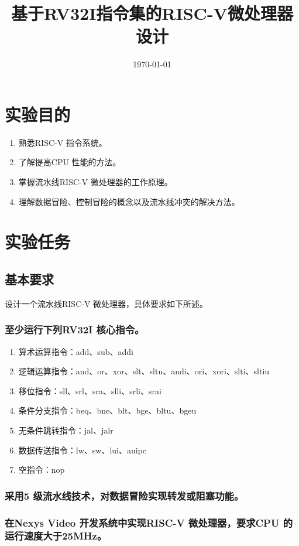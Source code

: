 \documentclass{../source/zjureport}
\title{基于RV32I指令集的RISC-V微处理器设计}
\date{\today}
\begin{document}
    \makecover
    \makeheader

    \section{实验目的}
        \begin{enumerate}
            \item 熟悉RISC-V 指令系统。
            \item 了解提高CPU 性能的方法。
            \item 掌握流水线RISC-V 微处理器的工作原理。
            \item 理解数据冒险、控制冒险的概念以及流水线冲突的解决方法。
        \end{enumerate}
    
    \section{实验任务}
        \subsection{基本要求}
        设计一个流水线RISC-V 微处理器，具体要求如下所述。
            \subsubsection{至少运行下列RV32I 核心指令。}
                \begin{enumerate}
                    \item 算术运算指令：add、sub、addi
                    \item 逻辑运算指令：and、or、xor、slt、sltu、andi、ori、xori、slti、sltiu
                    \item 移位指令：sll、srl、sra、slli、srli、srai
                    \item 条件分支指令：beq、bne、blt、bge、bltu、bgeu
                    \item 无条件跳转指令：jal、jalr
                    \item 数据传送指令：lw、sw、lui、auipc
                    \item 空指令：nop
                \end{enumerate}
            \subsubsection{采用5 级流水线技术，对数据冒险实现转发或阻塞功能。}
            \subsubsection{在Nexys Video 开发系统中实现RISC-V 微处理器，要求CPU 的运行速度大于25MHz。}
\end{document}

